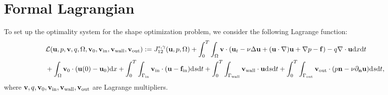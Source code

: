 \documentclass[oneside,11pt]{book}
\numberwithin{equation}{section}
\begin{document}
\section{Formal Lagrangian}
To set up the optimality system for the shape optimization problem, we consider the following Lagrange function:
\begin{align}
    \label{full instationary Lagrangian}
    &\mathcal{L}({\bf u},p,{\bf v},q,\Omega,{\bf v}_0,{\bf v}_{\rm in},{\bf v}_{\rm wall},{\bf v}_{\rm out}) := J_{12}^{\epsilon,\gamma}({\bf u},p,\Omega) + \int_0^T\int_\Omega {\bf v}\cdot({\bf u}_t - \nu\Delta{\bf u} + ({\bf u}\cdot\nabla){\bf u} + \nabla p - {\bf f}) - q\nabla\cdot{\bf u}{\rm d}x{\rm d}t \nonumber\\
    &+ \int_\Omega {\bf v}_0\cdot({\bf u}(0) - {\bf u}_0){\rm d}x + \int_0^T\int_{\Gamma_{\rm in}} {\bf v}_{\rm in}\cdot({\bf u} - {\bf f}_{\rm in}){\rm d}s{\rm d}t + \int_0^T\int_{\Gamma_{\rm wall}} {\bf v}_{\rm wall}\cdot{\bf u}{\rm d}s{\rm d}t + \int_0^T\int_{\Gamma_{\rm out}} {\bf v}_{\rm out}\cdot(p{\bf n} - \nu\partial_{\bf n}{\bf u}){\rm d}s{\rm d}t,
\end{align}
where ${\bf v},q,{\bf v}_0,{\bf v}_{\rm in},{\bf v}_{\rm wall},{\bf v}_{\rm out}$ are Lagrange multipliers.
\end{document}
